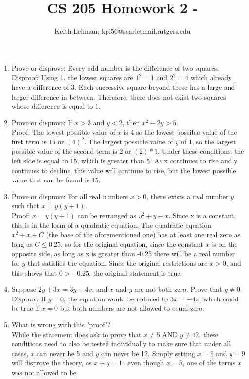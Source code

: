 \documentclass{article}
\title{CS 205 Homework 2 -}
\author{Keith Lehman, kpl56@scarletmail.rutgers.edu}
\begin{document}
\maketitle

\begin{enumerate}
\item Prove or disprove: Every odd number is the difference of two squares. \\
    Disproof: Using 1, the lowest squares are $1^2=1$ and $2^2=4$ which already have a difference of 3. Each successive square beyond these has a large and larger difference in between. Therefore, there does not exist two squares whose difference is equal to 1.
\item Prove or disprove: If $x > 3$ and $y < 2$, then $x^2 - 2y > 5$. \\
    Proof: The lowest possible value of $x$ is 4 so the lowest possible value of the first term is $16$ or $(4)^2$. The largest possible value of $y$ of 1, so the largest possible value of the second term is $2$ or $(2)*1$. Under these conditions, the left side is equal to 15, which is greater than 5. As x continues to rise and y continues to decline, this value will continue to rise, but the lowest possible value that can be found is 15.
\item Prove or disprove: For all real numbers $x>0$, there exists a real number $y$ such that $x=y(y+1)$. \\
    Proof: $x=y(y+1)$ can be rerranged as $y^2+y-x$. Since x is a constant, this is in the form of a quadratic equation. The quadratic equation $x^2+x+C$ (the base of the aforementioned one) has at least one real zero as long as $C \leq 0.25$, so for the original equation, since the constant $x$ is on the opposite side, as long as x is greater than -0.25 there will be a real number for $y$ that satisfies the equation. Since the original restrictions are $x > 0$, and this shows that $0 > -0.25$, the original statement is true.  
\item Suppose $2y+3x=3y-4x$, and $x$ and $y$ are not both zero. Prove that $y \neq 0$. \\
    Disproof: If $y=0$, the equation would be reduced to $3x=-4x$, which could be true if $x=0$ but both numbers are not allowed to equal zero. \Lightning
\item What is wrong with this "proof"? \\
    While the statement does ask to prove that $x \neq 5$ AND $y \neq 12$, these conditions need to also be tested individually to make sure that under all cases, $x$ can never be 5 and $y$ can never be 12. Simply setting $x=5$ and $y=9$ will disprove the theory, as $x+y=14$ even though $x=5$, one of the terms $x$ was not allowed to be.  

\end{enumerate}
\end{document}
